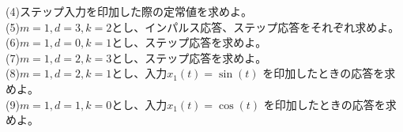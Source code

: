 \documentclass[a4paper,12pt]{article}
\begin{document}
\indent
(4)ステップ入力を印加した際の定常値を求めよ。\\

\indent
(5)\quad \( m=1,d=3,k=2\)とし、インパルス応答、ステップ応答をそれぞれ求めよ。\\

\indent
(6)\quad \( m=1,d=0,k=1\)とし、ステップ応答を求めよ。\\

\indent
(7)\quad \( m=1,d=2,k=3\)とし、ステップ応答を求めよ。\\

\indent
(8)\quad \( m=1,d=2,k=1\)とし、入力\(x_1(t)=\sin (t)\) を印加したときの応答を求めよ。\\

\indent
(9)\quad \( m=1,d=1,k=0\)とし、入力\(x_1(t)=\cos (t)\) を印加したときの応答を求めよ。\\
\end{document}
